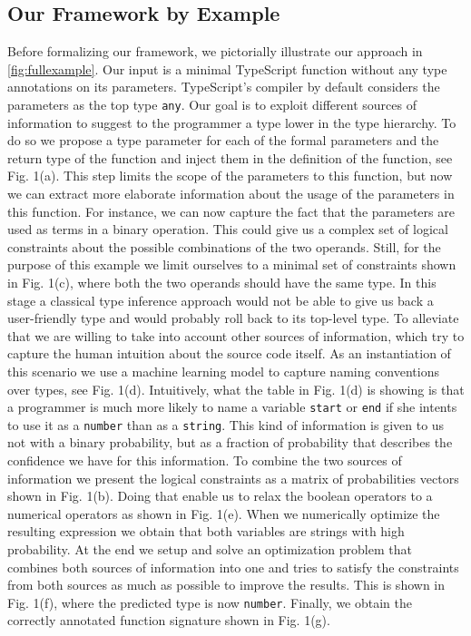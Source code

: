 \documentclass[sigplan,10pt,anonymous]{acmart} %
\theoremstyle{plain}
\theoremstyle{remark}
\theoremstyle{definition}
\begin{document}
\subsection{Our Framework by Example}
Before formalizing our framework, we pictorially illustrate our approach in \cref{fig:fullexample}.
Our input is a minimal TypeScript function without any type annotations on its parameters.
TypeScript's compiler by default considers the parameters as the top type \texttt{any}.
Our goal is to exploit different sources of information to suggest to the programmer
a type lower in the type hierarchy.
To do so we propose a type parameter for each of the formal parameters and the return type of the function
and inject them in the definition of the function, see Fig. 1(a).
This step limits the scope of the parameters to this function, but
now we can extract more elaborate information about the usage of the
parameters in this function.
For instance, we can now capture the
fact that the parameters are used as terms in a binary operation.
This could give us a complex set of logical constraints about the possible combinations of the two operands.
Still, for the purpose of this example we limit ourselves to a minimal set of constraints shown in Fig. 1(c),
where both the two operands should have the same type. In this stage a classical type inference approach would not be able to give us back a user-friendly type and would probably roll back to its top-level type. To alleviate that we are willing to take into account other sources of
information, which try to capture the human intuition about the source code itself. As an instantiation of this scenario we use a machine learning model to capture naming conventions over types, see Fig. 1(d).
Intuitively, what the table in Fig. 1(d) is showing is that a programmer
is much more likely to name a variable \texttt{start} or \texttt{end}
if she intents to use it as a \texttt{number} than as a \texttt{string}.
This kind of information is given to us not with a binary probability,
but as a fraction of probability that describes the confidence we have for this information. To combine the two sources of information we present the logical constraints as a matrix of probabilities vectors shown in Fig. 1(b). Doing that enable us to relax the boolean operators to a numerical
operators as shown in Fig. 1(e). When we numerically optimize the resulting expression we obtain that both variables are strings with high probability.
At the end we setup and solve an optimization problem that combines both sources of information into one and tries to satisfy the constraints from both sources as much as possible to improve the results.
This is shown in Fig. 1(f), where the predicted type is now \texttt{number}.
Finally, we obtain the correctly annotated function signature shown in Fig. 1(g).
\end{document}
